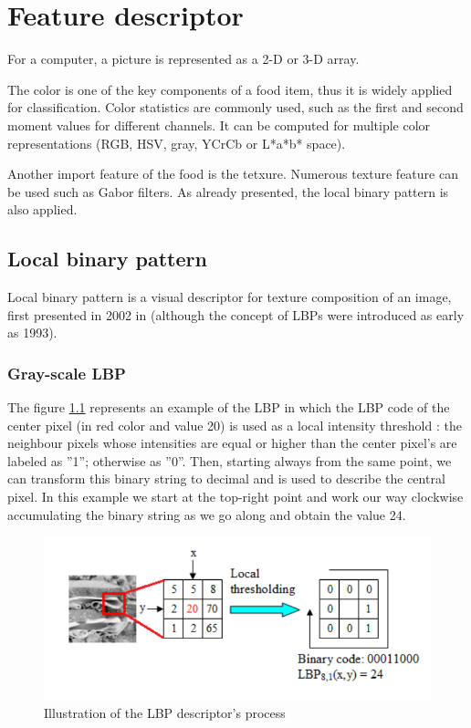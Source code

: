 \chapter{Feature descriptor} \label{sec:feature_descriptor}

For a computer, a picture is represented as a 2-D or 3-D array.

The color is one of the key components of a food item, thus it is widely applied for classification. Color statistics are commonly used, such as the first and second moment values for different channels. It can be computed for multiple color representations (RGB, HSV, gray, YCrCb or L*a*b* space).

Another import feature of the food is the tetxure. Numerous texture feature can be used such as Gabor filters. As already presented, the local binary pattern is also applied.

\section{Local binary pattern}


Local binary pattern is a visual descriptor for texture composition of an image, first presented in 2002 in \cite{Ojala2002} (although the concept of LBPs were introduced as early as 1993).

\subsection{Gray-scale LBP}

The figure \ref{fig:lbp_process} represents an example of the LBP in which the LBP code of the center pixel (in red color and value 20) is used as a local intensity threshold : the neighbour pixels whose intensities are equal or higher than the center pixel’s are labeled as ”1”; otherwise as ”0”. Then, starting always from the same point, we can transform this binary string to decimal and is used to describe the central pixel. In this example we start at the top-right point and work our way clockwise accumulating the binary string as we go along and obtain the value 24.

\begin{figure}[h]
    \includegraphics[scale=0.55]{img/lbp}
    \caption{Illustration of the LBP descriptor's process}
    \label{fig:lbp_process}
\end{figure}

